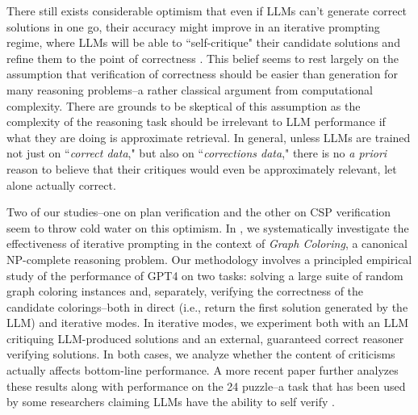 \documentclass{article}
\newcommand{\rao}[1]{\noindent\textcolor{red}{#1}}
\theoremstyle{plain}
\theoremstyle{definition}
\theoremstyle{remark}
\begin{document}
There still exists considerable optimism that even if LLMs can't generate correct solutions in one go, their accuracy might improve in an iterative prompting regime, where LLMs will be able to ``self-critique" their candidate solutions and refine them to the point of correctness \cite{yao2023react,yao2023tree,shinn2023reflexion, weng2023large,huang2022inner}. 
This belief seems to rest largely on the assumption that verification of correctness should be easier than generation for many reasoning problems--a rather classical argument from computational complexity. There are grounds to be skeptical of this assumption as the complexity of the reasoning task should 
be irrelevant to LLM performance if what they are doing is approximate retrieval. 
%
In general, unless LLMs are trained not just on ``{\em correct data}," but also on ``{\em corrections data}," there is no {\em a priori} reason to believe that their critiques would even be approximately relevant, let alone actually correct. 

Two of our studies--one on plan verification \cite{valmeekam2023can} and the other on CSP verification \cite{stechly2023gpt} seem to throw cold water on this optimism. 
In \cite{stechly2023gpt}, we systematically investigate the effectiveness of iterative prompting in the context of {\em Graph Coloring}, a canonical NP-complete reasoning problem. 
Our  methodology involves a principled empirical study of the
performance of GPT4 on two tasks: solving a large suite of random graph
coloring instances and, separately, verifying the correctness of the
candidate colorings--both in direct (i.e., return the first solution
generated by the LLM) and iterative modes. In iterative modes, we
experiment both with an LLM critiquing LLM-produced solutions and an
external, guaranteed correct reasoner verifying solutions. In both
cases, we analyze whether the content of criticisms actually affects
bottom-line performance. A more recent paper further analyzes these
results along with performance on the 24 puzzle--a task that has been used
by some researchers claiming LLMs have the ability to self verify
\cite{karthik-kaya-self-verification-combined}. 
\end{document}
